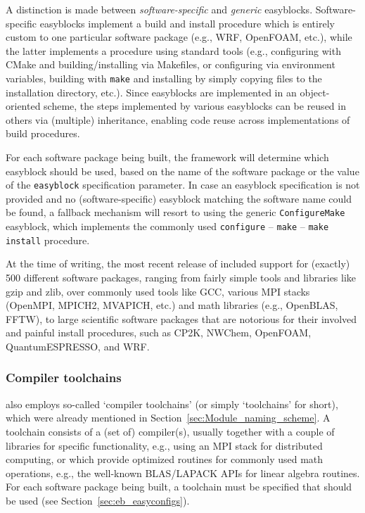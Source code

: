 A distinction is made between \emph{software-specific} and \emph{generic} easyblocks.
Software-specific easyblocks implement a build and install procedure which is entirely
custom to one particular software package (e.g., WRF, OpenFOAM, etc.), while the
latter implements a procedure using standard tools (e.g., configuring with CMake and
building/installing via Makefiles, or configuring via environment variables, building
with \texttt{make} and installing by simply copying files to the installation
directory, etc.). Since easyblocks are implemented in an object-oriented scheme,
the steps implemented by various easyblocks can be reused in others via (multiple)
inheritance, enabling code reuse across implementations of build procedures.

For each software package being built, the \easybuild{} framework will determine
which easyblock should be used, based on the name of the software package or the
value of the \texttt{easyblock} specification parameter. In case an easyblock
specification is not provided and no (software-specific) easyblock matching the
software name could be found, a fallback mechanism will resort to using the generic
\texttt{ConfigureMake} easyblock, which implements the commonly used
\texttt{configure} -- \texttt{make} -- \texttt{make install} procedure.

At the time of writing, the most recent release of \easybuild{} included support for
(exactly) 500 different software packages, ranging from fairly simple tools and
libraries like gzip and zlib, over commonly used tools like GCC, various MPI
stacks (OpenMPI, MPICH2, MVAPICH, etc.) and math libraries (e.g., OpenBLAS,
FFTW), to large scientific software packages that are notorious for their involved
and painful install procedures, such as CP2K, NWChem, OpenFOAM, QuantumESPRESSO, and
WRF.

\subsubsection{Compiler toolchains}
\label{sec:eb_toolchains}

\easybuild{} also employs so-called `compiler toolchains' (or simply `toolchains'
for short), which were already mentioned in Section~\ref{sec:Module_naming_scheme}.
A toolchain consists of a (set of) compiler(s), usually together with a couple of
libraries for specific functionality, e.g., using an MPI stack for distributed
computing, or which provide optimized routines for commonly used math operations,
e.g., the well-known BLAS/LAPACK APIs for linear algebra routines. For each software
package being built, a toolchain must be specified that should be used
(see Section~\ref{sec:eb_easyconfigs}).

